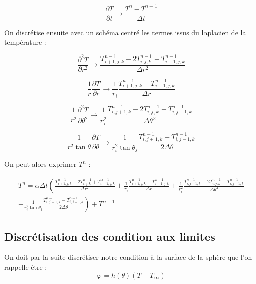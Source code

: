 \documentclass[fleqn]{article}
\renewcommand{\phi}{\varphi}
\begin{document}
\begin{equation}
    \frac{ \partial T}{\partial t} \rightarrow  \frac{T^n - T^{n-1}}{\Delta t} 
\end{equation}

On discrétise ensuite avec un schéma centré les termes issus du laplacien de la température :


\begin{equation}
    \frac{ \partial ^2 T}{\partial r^2} \rightarrow 
    \frac{T_{i+1,j,k}^{n-1} - 2 T_{i,j,k}^{n-1} + T_{i-1,j,k}^{n-1}}{\Delta r^2}
\end{equation}

\begin{equation}
    \frac{1}{r}\frac{ \partial T}{\partial r} \rightarrow 
    \frac{1}{r_i}\frac{T_{i+1,j,k}^{n-1} - T_{i-1,j,k}^{n-1}}{\Delta r}
\end{equation}

\begin{equation}
    \frac{1}{r^2}\frac{ \partial^2 T}{\partial \theta^2} \rightarrow 
    \frac{1}{r_i^2}\frac{T_{i,j+1,k}^{n-1} - 2 T_{i,j,k}^{n-1} + T_{i,j-1,k}^{n-1}}{\Delta \theta^2}
\end{equation}

\begin{equation}
    \frac{1}{r^2 \tan \theta}\frac{ \partial T}{\partial \theta} \rightarrow 
    \frac{1}{r_i^2 \tan \theta_j }\frac{T_{i,j+1,k}^{n-1} - T_{i,j-1,k}^{n-1}}{2\Delta \theta}
\end{equation}


On peut alors exprimer $T^n$ :

\begin{multline}
    T^n = \alpha \Delta t  \left( \frac{T_{i+1,j,k}^{n-1} - 2 T_{i,j,k}^{n-1} + T_{i-1,j,k}^{n-1}}{\Delta r^2}+\frac{1}{r_i}\frac{T_{i+1,j,k}^{n-1} - T_{i-1,j,k}^{n-1}}{\Delta r} + \frac{1}{r_i^2}\frac{T_{i,j+1,k}^{n-1} - 2 T_{i,j,k}^{n-1} + T_{i,j-1,k}^{n-1}}{\Delta \theta^2}\right. \\
    +\left.\frac{1}{r_i^2 \tan \theta_j }\frac{T_{i,j+1,k}^{n-1} - T_{i,j-1,k}^{n-1}}{2\Delta \theta}\right)  + T^{n-1}
    \label{discretisation Gal}
\end{multline}


\subsection{Discrétisation des condition aux limites}

On doit par la suite discrétiser notre condition à la surface de la sphère que l'on rappelle être :
\begin{equation}
    \phi = h(\theta)(T - T_{\infty})
\end{equation}
\end{document}
